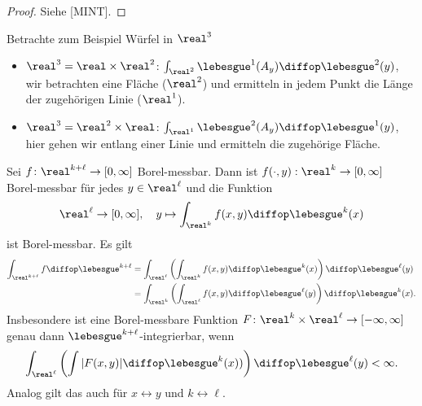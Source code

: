 \begin{proof}
 Siehe [MINT].
\end{proof}

Betrachte zum Beispiel Würfel in $\real^3$
\begin{itemize}
 \item $\real^3 = \real \times \real^2$: $\int_{\real^2} \lebesgue^1 (A_y) \diffop \lebesgue^2(y)$, wir betrachten eine Fläche ($\real^2$) und ermitteln in jedem Punkt die Länge der zugehörigen Linie ($\real^1$).
 \item $\real^3 = \real^2 \times \real$: $\int_{\real^1} \lebesgue^2 (A_y) \diffop \lebesgue^1(y)$, hier gehen wir entlang einer Linie und ermitteln die zugehörige Fläche.
\end{itemize}

\begin{thm}[Tonelli]{}
 Sei $f\colon\real^{k+\ell} \to [0, \infty]$ Borel-messbar. Dann ist $f(\cdot,y):\real^k \to [0,\infty]$ Borel-messbar für jedes $y \in \real^\ell$ und die Funktion
 \[ \real^\ell \to [0,\infty], \quad y \mapsto \int_{\real^k} f(x,y) \diffop \lebesgue^k (x) \]
 ist Borel-messbar. Es gilt
 \[ \begin{aligned} \int_{\real^{k+\ell}} f \diffop \lebesgue^{k+\ell} 
    &= \int_{\real^\ell} \left( \int_{\real^k} f(x,y) \diffop \lebesgue^k (x) \right) \diffop \lebesgue^\ell (y) \\
    &= \int_{\real^k} \left( \int_{\real^\ell} f(x,y) \diffop \lebesgue^\ell (y) \right) \diffop \lebesgue^k (x).
 \end{aligned} \]
 Insbesondere ist eine Borel-messbare Funktion $F\colon \real^k \times \real^\ell \to [-\infty, \infty]$ genau dann $\lebesgue^{k+\ell}$-integrierbar, wenn
 \[ \int_{\real^\ell} \left( \int |F(x,y)| \diffop \lebesgue^k (x) ) \right) \diffop \lebesgue^\ell (y) < \infty. \]
 Analog gilt das auch für $x \leftrightarrow y$ und $k \leftrightarrow \ell$.
\end{thm}

